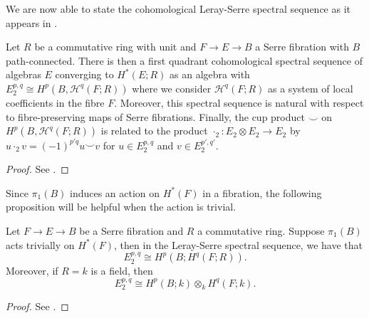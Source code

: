 \documentclass[../main.tex]{subfiles}
\begin{document}
We are now able to state the cohomological Leray-Serre
spectral sequence as it appears in \cite[]{Le00} .
\begin{theorem}
    \label{thm:sss}
   Let \( R \) be a commutative ring with unit and 
   \( F\rightarrow E \rightarrow B \) a Serre fibration with \( B \) path-connected.
   There is then a first quadrant cohomological spectral sequence of
   algebras \( E \) converging to \( H^*(E;R) \) as an algebra with
   \( E_2^{p,q}\cong H^p(B,\mathcal{H}^q(F;R)) \) where we consider
   \( \mathcal{H}^q(F; R) \) as a system of local coefficients in the
   fibre \( F \). Moreover, this spectral sequence is natural with
   respect to fibre-preserving maps of Serre fibrations. Finally,
   the cup product \( \smile \) on \( H^p(B,\mathcal{H}^q(F;R)) \) is
   related to the product \( \cdot_2:E_2\otimes E_2\rightarrow E_2 \) 
   by \( u\cdot_2 v = (-1)^{p'q}u\smile v \) for \( u\in E^{p,q}_2 \) 
   and \( v\in E_2^{p',q'} \).
\end{theorem}
\begin{proof}
    See \cite[]{Le00}.
\end{proof}
Since \( \pi_1(B) \) induces an action on \( H^*(F) \) in a fibration, the
following proposition will be helpful when the action is trivial.
\begin{proposition}
    \label{prop:coefficients}
   Let \( F\rightarrow E \rightarrow B \) be a Serre fibration and
   \( R \) a commutative ring.
   Suppose \( \pi_1(B) \) acts trivially on \( H^*(F) \), then in
   the Leray-Serre spectral sequence, we have that
   \begin{equation}
       E^{p, q}_2 \cong H^p(B; H^q(F;R)).
   \end{equation}
    Moreover, if \( R=k \) is a field, then
    \begin{equation}
        E^{p, q}_2 \cong H^p(B;k)\otimes_k H^q(F;k).
    \end{equation}
\end{proposition}
\begin{proof}
See \cite[]{Hat04}.
\end{proof}
\end{document}
